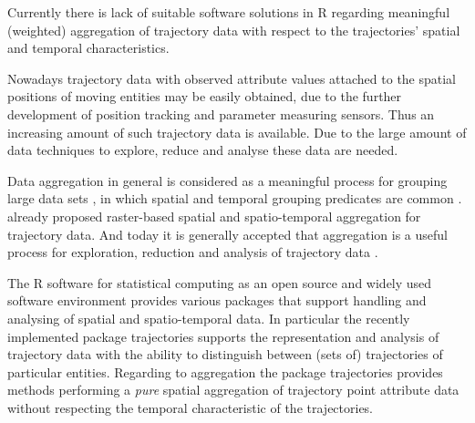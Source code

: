 \documentclass[12pt, oneside, a4paper]{scrbook}
\newcommand{\pkg}[1]{{\normalfont\fontseries{b}\selectfont #1}}
\let\proglang=\textsf
\begin{document}

Currently there is lack of suitable software solutions in \proglang{R} regarding meaningful (weighted) aggregation of trajectory data with respect to the trajectories' spatial and temporal characteristics.
\par\medskip


Nowadays trajectory data with observed attribute values attached to the spatial positions of moving entities may be easily obtained, due to the further development of position tracking and parameter measuring sensors.
Thus an increasing amount of such trajectory data is available.
Due to the large amount of data techniques to explore, reduce and analyse these data are needed.
\par\medskip

Data aggregation in general is considered as a meaningful process for grouping large data sets \citep{goldstein_using_1994}, 
in which spatial and temporal grouping predicates are common \citep{fredrikson_temporal_1999}. 
\citet{meratnia_aggregation_2002} already proposed raster-based spatial and spatio-temporal aggregation for trajectory data.
And today it is generally accepted that aggregation is a useful process for exploration, reduction and analysis of trajectory data \citep{andrienko_exploratory_2003, giannotti_trajectory_2007, andrienko_spatial_2011}.
\par\medskip

The \proglang{R} software for statistical computing \citep{r_development_core_team_r:_2014} as an open source and widely used software environment provides various packages that support handling and analysing of spatial and spatio-temporal data.
In particular the recently implemented package \pkg{trajectories} \citep{pebesma_trajectories:_2014} supports the representation and analysis of trajectory data with the ability to distinguish between (sets of) trajectories of particular entities.
Regarding to aggregation the package \pkg{trajectories} provides methods performing a \textit{pure} spatial aggregation of trajectory point attribute data without respecting the temporal characteristic of the trajectories.
\par\medskip

\end{document}
